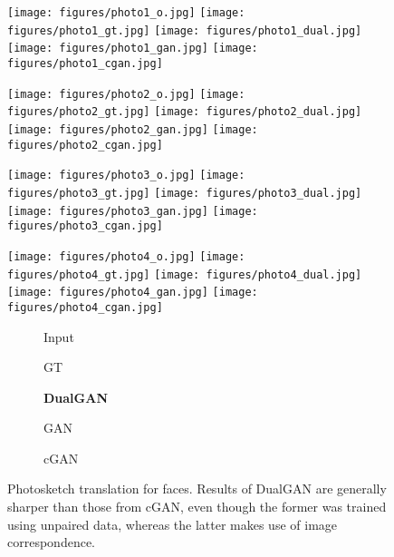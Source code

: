 \begin{figure}
\begin{center}
\texttt{[image: figures/photo1\_o.jpg]}
\texttt{[image: figures/photo1\_gt.jpg]}
\texttt{[image: figures/photo1\_dual.jpg]}
\texttt{[image: figures/photo1\_gan.jpg]}
\texttt{[image: figures/photo1\_cgan.jpg]}

\texttt{[image: figures/photo2\_o.jpg]}
\texttt{[image: figures/photo2\_gt.jpg]}
\texttt{[image: figures/photo2\_dual.jpg]}
\texttt{[image: figures/photo2\_gan.jpg]}
\texttt{[image: figures/photo2\_cgan.jpg]}

\texttt{[image: figures/photo3\_o.jpg]}
\texttt{[image: figures/photo3\_gt.jpg]}
\texttt{[image: figures/photo3\_dual.jpg]}
\texttt{[image: figures/photo3\_gan.jpg]}
\texttt{[image: figures/photo3\_cgan.jpg]}

\texttt{[image: figures/photo4\_o.jpg]}
\texttt{[image: figures/photo4\_gt.jpg]}
\texttt{[image: figures/photo4\_dual.jpg]}
\texttt{[image: figures/photo4\_gan.jpg]}
\texttt{[image: figures/photo4\_cgan.jpg]}

\begin{subfigure}[]{0.19\linewidth}\caption*{Input}\end{subfigure}
\begin{subfigure}[]{0.19\linewidth}\caption*{GT}\end{subfigure}
\begin{subfigure}[]{0.19\linewidth}\caption*{\textbf{DualGAN}}\end{subfigure}
\begin{subfigure}[]{0.19\linewidth}\caption*{GAN}\end{subfigure}
\begin{subfigure}[]{0.19\linewidth}\caption*{cGAN~\cite{isola2016image}}\end{subfigure}
\caption{Photosketch translation for faces. Results of DualGAN are 
generally sharper than those from cGAN, even though the former was trained using 
unpaired data, whereas the latter makes use of image correspondence.}
\label{fig:photo}
\end{center}
\end{figure}

